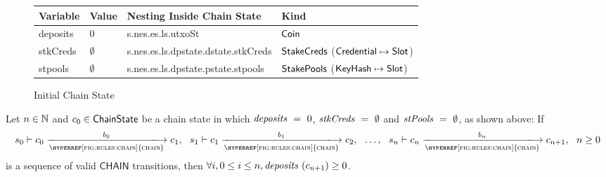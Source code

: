 \begin{figure}[h!]
  \begin{tabular}{||l|l|l|l||}\hline\hline

    \textbf{Variable} & \textbf{Value}
                      & \textbf{Nesting Inside Chain State} & \textbf{Kind} \\ \hline
    deposits & 0 &  s.nes.es.ls.utxoSt & $\mathsf{Coin}$ \\ \hline
    stkCreds & $\emptyset$ & s.nes.es.ls.dpstate.dstate.stkCreds
             & $\mathsf{StakeCreds}$ ($\mathsf{Credential}\mapsto\mathsf{Slot}$)  \\ \hline
    stpools & $\emptyset$ & s.nes.es.ls.dpstate.pstate.stpools
            & $\mathsf{StakePools}$ ($\mathsf{KeyHash}\mapsto\mathsf{Slot}$)  \\ \hline
  \end{tabular}
  \caption{Initial Chain State}
  \end{figure}

\begin{theorem}
  \label{thm:non-neg-deposits}
  Let $n\in\mathbb{N}$ and $c_0\in\mathsf{ChainState}$ be a chain state in which $\mathit{deposits} ~=~0$, $\mathit{stkCreds}~=~\emptyset$ and $\mathit{stPools}~=~\emptyset$, as shown above:
  If
  \begin{equation*}
    s_0\vdash c_0\trans{\hyperref[fig:rules:chain]{chain}}{b_0}c_1,~~
    s_1\vdash c_1\trans{\hyperref[fig:rules:chain]{chain}}{b_1}c_2,~~
    \ldots,~~
    s_n\vdash c_n\trans{\hyperref[fig:rules:chain]{chain}}{b_n}c_{n+1},~~n \ge 0
  \end{equation*}
  is a sequence of valid $\mathsf{CHAIN}$ transitions,
  then $\forall i, 0 \le i \le n, \mathit{deposits} ~(c_{n+1}) \ge 0$.
\end{theorem}

